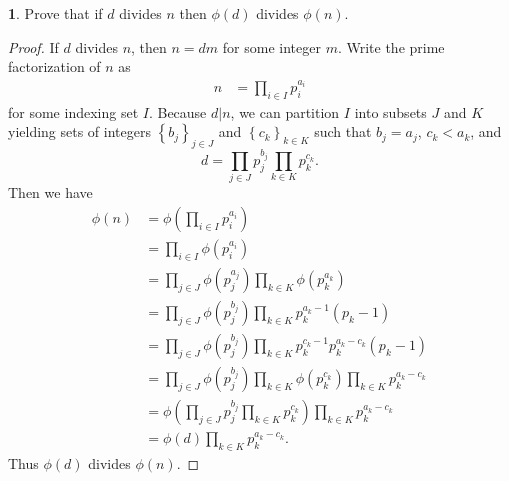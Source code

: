 \documentclass[12pt]{article}
\theoremstyle{definition}
\newtheorem{ex}{}
\begin{document}
\begin{ex}
	Prove that if $d$ divides $n$ then $\phi(d)$ divides $\phi(n)$.
\end{ex}
\begin{proof}
	If $d$ divides $n$, then $n = dm$ for some integer $m$.
	Write the prime factorization of $n$ as \begin{align*}
		n & = \prod_{i \in I} p_i^{a_i}
	\end{align*}
	for some indexing set $I$.
	Because $d | n$, we can partition $I$ into subsets $J$ and $K$ yielding sets of integers $\left\lbrace b_j \right\rbrace_{j \in J}$ and $\left\lbrace c_k \right\rbrace_{k \in K}$ such that $b_j = a_j$, $c_k < a_k$, and \begin{equation*}
		d = \prod_{j \in J} p_j^{b_j} \prod_{k \in K} p_k^{c_k}.
	\end{equation*}
	Then we have \begin{align*}
		\phi(n) & = \phi\left(\prod_{i \in I} p_i^{a_i} \right)                                                               \\
		        & = \prod_{i \in I} \phi\left( p_i^{a_i} \right)                                                              \\
		        & = \prod_{j \in J} \phi\left( p_j^{a_j} \right)\prod_{k \in K} \phi\left( p_k^{a_k} \right)                  \\
		        & = \prod_{j \in J} \phi\left( p_j^{b_j} \right)\prod_{k \in K} p_k^{a_k-1}(p_k-1)                            \\
		        & = \prod_{j \in J} \phi\left( p_j^{b_j} \right)\prod_{k \in K} p_k^{c_k - 1} p_k^{a_k-c_k}(p_k-1)            \\
		        & = \prod_{j \in J} \phi\left( p_j^{b_j} \right)\prod_{k \in K} \phi(p_k^{c_k}) \prod_{k \in K} p_k^{a_k-c_k} \\
		        & = \phi \left( \prod_{j \in J} p_j^{b_j}\prod_{k \in K} p_k^{c_k} \right) \prod_{k \in K} p_k^{a_k-c_k}      \\
		        & = \phi ( d ) \prod_{k \in K} p_k^{a_k-c_k}.
	\end{align*}
	Thus $\phi(d)$ divides $\phi(n)$.
\end{proof}
\end{document}
